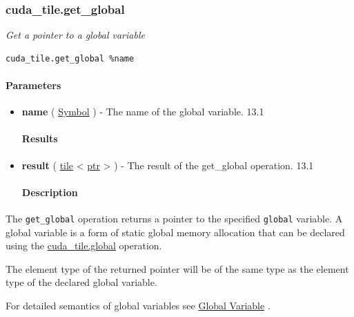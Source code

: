 \documentclass{article}
\begin{document}
\subsubsection{cuda\_tile.get\_global}

\textit{Get a pointer to a global variable}


\begin{lstlisting}
cuda_tile.get_global %name
\end{lstlisting}

\paragraph{Parameters}

\begin{itemize}
\item \textbf{name} ( \href{https://docs.nvidia.com/cuda/tile-ir/latest/sections/operations.html#type-symbol}{Symbol} ) - The name of the global variable. 13.1


\paragraph{Results}

\item \textbf{result} ( \href{https://docs.nvidia.com/cuda/tile-ir/latest/sections/types.html#type-tile}{tile} < \href{https://docs.nvidia.com/cuda/tile-ir/latest/sections/types.html#type-ptr}{ptr} > ) - The result of the get\_global operation. 13.1


\paragraph{Description}

\end{itemize}
The \texttt{get\_global} operation returns a pointer to the specified \texttt{global} variable. A global variable is a form of static global memory allocation that can be declared using the \href{https://docs.nvidia.com/cuda/tile-ir/latest/sections/operations.html#op-cuda-tile-global}{cuda\_tile.global} operation.


The element type of the returned pointer will be of the same type as the element type of the declared global variable.


For detailed semantics of global variables see \href{https://docs.nvidia.com/cuda/tile-ir/latest/sections/semantics.html#sub-sec-tile-global}{Global Variable} .
\end{document}

